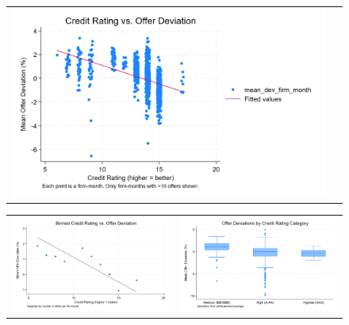\documentclass[12pt]{article}
\begin{document}
\begin{figure}[H]
\caption{}
 \label{fig:ie4_4}
\centering{}%
\begin{tabular}{cc}
\includegraphics[scale=0.17]{figures/IE4/IE4_scatter_rating_offer.png} 
\end{tabular}
\end{figure}

\begin{figure}[H]
\caption{}
 \label{fig:ie4_5and6}
\centering{}%
\begin{tabular}{cc}
\includegraphics[scale=0.17]{figures/IE4/IE4_binscatter_rating_offer.png} & \includegraphics[scale=0.17]{figures/IE4/IE4_box_rating_offer.png}
\end{tabular}
\end{figure}
\end{document}
